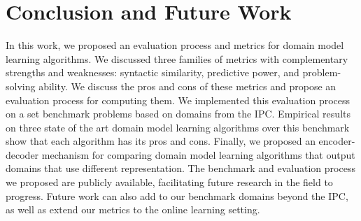 \documentclass{article}
\theoremstyle{definition}
\theoremstyle{remark}
\newcommand{\sam}{\ac{SAM}\xspace}
\newif\ifaddcomments
\newcommand{\roni}[1]{\ifaddcomments{\textcolor{red}{[Roni: #1]}}\fi}
\begin{document}
\section{Conclusion and Future Work}
In this work, we proposed an evaluation process and metrics for domain model learning algorithms. We discussed three families of metrics with complementary strengths and weaknesses: syntactic similarity, predictive power, and problem-solving ability. 
We discuss the pros and cons of these metrics and propose an evaluation process for computing them. We implemented this evaluation process on a set benchmark problems based on domains from the IPC. 
Empirical results on three state of the art domain model learning algorithms over this benchmark show that each algorithm has its pros and cons. 
Finally, we proposed an encoder-decoder mechanism for comparing domain model learning algorithms that output domains that use different representation. 
The benchmark and evaluation process we proposed are publicly available, facilitating future research in the field to progress. Future work can also add to our benchmark domains beyond the IPC, as well as extend our metrics to the online learning setting. 








 

% 
\end{document}
